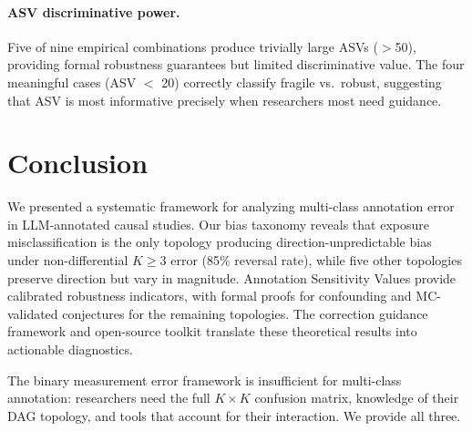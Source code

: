 \documentclass[11pt]{article}
\begin{document}
\paragraph{ASV discriminative power.}
Five of nine empirical combinations produce trivially large ASVs ($>$50), providing formal robustness guarantees but limited discriminative value.
The four meaningful cases (ASV $<$ 20) correctly classify fragile vs.\ robust, suggesting that ASV is most informative precisely when researchers most need guidance.

\section{Conclusion}

We presented a systematic framework for analyzing multi-class annotation error in LLM-annotated causal studies.
Our bias taxonomy reveals that exposure misclassification is the only topology producing direction-unpredictable bias under non-differential $K \geq 3$ error (85\% reversal rate), while five other topologies preserve direction but vary in magnitude.
Annotation Sensitivity Values provide calibrated robustness indicators, with formal proofs for confounding and MC-validated conjectures for the remaining topologies.
The correction guidance framework and open-source toolkit translate these theoretical results into actionable diagnostics.

The binary measurement error framework is insufficient for multi-class annotation: researchers need the full $K \times K$ confusion matrix, knowledge of their DAG topology, and tools that account for their interaction.
We provide all three.
\end{document}

